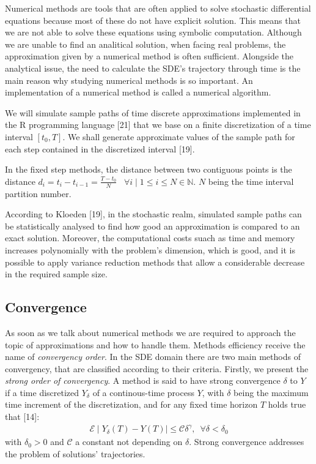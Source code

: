 \documentclass[12pt,twoside]{reedthesis}
\theoremstyle{definition}
\theoremstyle{definition}
\theoremstyle{remark}
\begin{document}
  Numerical methods are tools that are often applied to solve stochastic
  differential equations because most of these do not have explicit
  solution. This means that we are not able to solve these equations using
  symbolic computation. Although we are unable to find an analitical
  solution, when facing real problems, the approximation given by a
  numerical method is often sufficient. Alongside the analytical issue,
  the need to calculate the SDE's trajectory through time is the main
  reason why studying numerical methods is so important. An implementation
  of a numerical method is called a numerical algorithm.
  
  We will simulate sample paths of time discrete approximations
  implemented in the R programming language {[}21{]} that we base on a
  finite discretization of a time interval \([t_0, T]\). We shall generate
  approximate values of the sample path for each step contained in the
  discretized interval {[}19{]}.
  
  In the fixed step methods, the distance between two contiguous points is
  the distance
  \(d_i = t_i - t_{i-1} = \frac{T-t_0}{N} \;\;\; \forall i \mid 1 \leq i \leq N \in \mathbb{N}\).
  \(N\) being the time interval partition number.
  
  According to Kloeden {[}19{]}, in the stochastic realm, simulated sample
  paths can be statistically analysed to find how good an approximation is
  compared to an exact solution. Moreover, the computational costs suach
  as time and memory increases polynomially with the problem's dimension,
  which is good, and it is possible to apply variance reduction methods
  that allow a considerable decrease in the required sample size.
  
  \subsection{Convergence}\label{convergence}
  
  As soon as we talk about numerical methods we are required to approach
  the topic of approximations and how to handle them. Methods efficiency
  receive the name of \emph{convergency order}. In the SDE domain there
  are two main methods of convergency, that are classified according to
  their criteria. Firstly, we present the \emph{strong order of
  convergency}. A method is said to have strong convergence \(\delta\) to
  \(Y\) if a time discretized \(Y_{\delta}\) of a continous-time process
  \(Y\), with \(\delta\) being the maximum time increment of the
  discretization, and for any fixed time horizon \(T\) holds true that
  {[}14{]}:
  \begin{align*}
  \mathcal{E} \mid Y_{\delta}(T) - Y(T) \mid \leq \mathcal{C} \delta^{\gamma}, \,\,\, \forall \delta < \delta_0
  \end{align*}
  with \(\delta_0 > 0\) and \(\mathcal{C}\) a constant not depending on
  \(\delta\). Strong convergence addresses the problem of solutions'
  trajectories.
  
\end{document}
